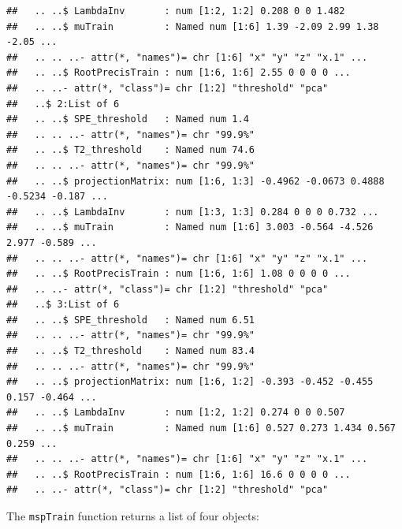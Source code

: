 \documentclass{report}\usepackage[]{graphicx}\usepackage[]{color}
\makeatletter
\newenvironment{kframe}{%
 \def\at@end@of@kframe{}%
 \ifinner\ifhmode%
  \def\at@end@of@kframe{\end{minipage}}%
  \begin{minipage}{\columnwidth}%
 \fi\fi%
 \def\FrameCommand##1{\hskip\@totalleftmargin \hskip-\fboxsep
 \colorbox{shadecolor}{##1}\hskip-\fboxsep
     \hskip-\linewidth \hskip-\@totalleftmargin \hskip\columnwidth}%
 \MakeFramed {\advance\hsize-\width
   \@totalleftmargin\z@ \linewidth\hsize
   \@setminipage}}%
 {\par\unskip\endMakeFramed%
 \at@end@of@kframe}
\newenvironment{knitrout}{}{} %
\makeatother
\begin{document}
\begin{knitrout}
\begin{kframe}
\begin{verbatim}
##   .. ..$ LambdaInv       : num [1:2, 1:2] 0.208 0 0 1.482
##   .. ..$ muTrain         : Named num [1:6] 1.39 -2.09 2.99 1.38 -2.05 ...
##   .. .. ..- attr(*, "names")= chr [1:6] "x" "y" "z" "x.1" ...
##   .. ..$ RootPrecisTrain : num [1:6, 1:6] 2.55 0 0 0 0 ...
##   .. ..- attr(*, "class")= chr [1:2] "threshold" "pca"
##   ..$ 2:List of 6
##   .. ..$ SPE_threshold   : Named num 1.4
##   .. .. ..- attr(*, "names")= chr "99.9%"
##   .. ..$ T2_threshold    : Named num 74.6
##   .. .. ..- attr(*, "names")= chr "99.9%"
##   .. ..$ projectionMatrix: num [1:6, 1:3] -0.4962 -0.0673 0.4888 -0.5234 -0.187 ...
##   .. ..$ LambdaInv       : num [1:3, 1:3] 0.284 0 0 0 0.732 ...
##   .. ..$ muTrain         : Named num [1:6] 3.003 -0.564 -4.526 2.977 -0.589 ...
##   .. .. ..- attr(*, "names")= chr [1:6] "x" "y" "z" "x.1" ...
##   .. ..$ RootPrecisTrain : num [1:6, 1:6] 1.08 0 0 0 0 ...
##   .. ..- attr(*, "class")= chr [1:2] "threshold" "pca"
##   ..$ 3:List of 6
##   .. ..$ SPE_threshold   : Named num 6.51
##   .. .. ..- attr(*, "names")= chr "99.9%"
##   .. ..$ T2_threshold    : Named num 83.4
##   .. .. ..- attr(*, "names")= chr "99.9%"
##   .. ..$ projectionMatrix: num [1:6, 1:2] -0.393 -0.452 -0.455 0.157 -0.464 ...
##   .. ..$ LambdaInv       : num [1:2, 1:2] 0.274 0 0 0.507
##   .. ..$ muTrain         : Named num [1:6] 0.527 0.273 1.434 0.567 0.259 ...
##   .. .. ..- attr(*, "names")= chr [1:6] "x" "y" "z" "x.1" ...
##   .. ..$ RootPrecisTrain : num [1:6, 1:6] 16.6 0 0 0 0 ...
##   .. ..- attr(*, "class")= chr [1:2] "threshold" "pca"
\end{verbatim}
\end{kframe}
\end{knitrout}
The \texttt{mspTrain} function returns a list of four objects:
\end{document}
